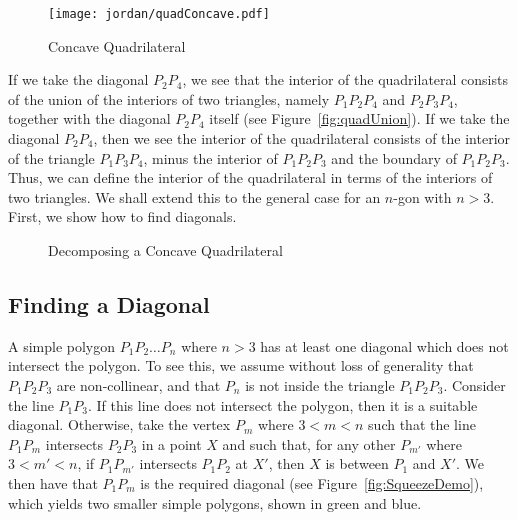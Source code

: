 \begin{figure}
  \centering
  \texttt{[image: jordan/quadConcave.pdf]}
  \caption{Concave Quadrilateral}
  \label{fig:quadConcave}
\end{figure}

If we take the diagonal $P_2P_4$, we see that the interior of the quadrilateral consists of the union of the interiors of two triangles, namely $P_1P_2P_4$ and $P_2P_3P_4$, together with the diagonal $P_2P_4$ itself (see Figure~\ref{fig:quadUnion}). If we take the diagonal $P_2P_4$, then we see the interior of the quadrilateral consists of the interior of the triangle $P_1P_3P_4$, minus the interior of $P_1P_2P_3$ and the boundary of $P_1P_2P_3$. Thus, we can define the interior of the quadrilateral in terms of the interiors of two triangles. We shall extend this to the general case for an $n$-gon with $n>3$. First, we show how to find diagonals.

\begin{figure}
  \centering 

  \caption{Decomposing a Concave Quadrilateral}
  \label{fig:quadDecompose}
\end{figure}

\subsection{Finding a Diagonal}\label{sec:FindingDiagonal}
A simple polygon $P_1P_2 \ldots P_n$ where $n>3$ has at least one diagonal which does not intersect the polygon. To see this, we assume without loss of generality that $P_1P_2P_3$ are non-collinear, and that $P_n$ is not inside the triangle $P_1P_2P_3$. Consider the line $P_1P_3$. If this line does not intersect the polygon, then it is a suitable diagonal. Otherwise, take the vertex $P_m$ where $3 < m < n$ such that the line $P_1P_m$ intersects $P_2P_3$ in a point $X$ and such that, for any other $P_{m'}$ where $3 < m' < n$, if $P_1P_{m'}$ intersects $P_1P_2$ at $X'$, then $X$ is between $P_1$ and $X'$. We then have that $P_1P_m$ is the required diagonal (see Figure~\ref{fig:SqueezeDemo}), which yields two smaller simple polygons, shown in green and blue.

